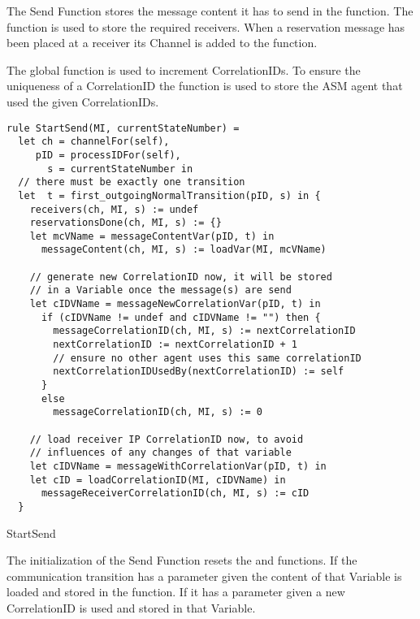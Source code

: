 The Send Function stores the message content it has to send in the
 function. The  function is
used to store the required receivers. When a reservation message has been
placed at a receiver its Channel is added to the 
function.

The global function  is used to increment
CorrelationIDs. To ensure the uniqueness of a CorrelationID the
 function is used to store the ASM agent
that used the given CorrelationIDs.


\begin{listing}[H]
\begin{verbatim}
rule StartSend(MI, currentStateNumber) =
  let ch = channelFor(self),
     pID = processIDFor(self),
       s = currentStateNumber in
  // there must be exactly one transition
  let  t = first_outgoingNormalTransition(pID, s) in {
    receivers(ch, MI, s) := undef
    reservationsDone(ch, MI, s) := {}
    let mcVName = messageContentVar(pID, t) in
      messageContent(ch, MI, s) := loadVar(MI, mcVName)

    // generate new CorrelationID now, it will be stored
    // in a Variable once the message(s) are send
    let cIDVName = messageNewCorrelationVar(pID, t) in
      if (cIDVName != undef and cIDVName != "") then {
        messageCorrelationID(ch, MI, s) := nextCorrelationID
        nextCorrelationID := nextCorrelationID + 1
        // ensure no other agent uses this same correlationID
        nextCorrelationIDUsedBy(nextCorrelationID) := self
      }
      else
        messageCorrelationID(ch, MI, s) := 0

    // load receiver IP CorrelationID now, to avoid
    // influences of any changes of that variable
    let cIDVName = messageWithCorrelationVar(pID, t) in
    let cID = loadCorrelationID(MI, cIDVName) in
      messageReceiverCorrelationID(ch, MI, s) := cID
  }
\end{verbatim}
\caption{StartSend}
\label{lst:shortasm:StartSend}
\end{listing}


The initialization of the Send Function resets the  and
 functions.
If the communication transition has a  parameter given the
content of that Variable is loaded and stored in the 
function. If it has a  parameter given
a new CorrelationID is used and stored in that Variable.

